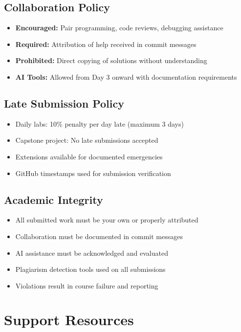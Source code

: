\documentclass[11pt,a4paper]{article}
\begin{document}
\subsection{Collaboration Policy}
\begin{itemize}
    \item \textbf{Encouraged:} Pair programming, code reviews, debugging assistance
    \item \textbf{Required:} Attribution of help received in commit messages
    \item \textbf{Prohibited:} Direct copying of solutions without understanding
    \item \textbf{AI Tools:} Allowed from Day 3 onward with documentation requirements
\end{itemize}

\subsection{Late Submission Policy}
\begin{itemize}
    \item Daily labs: 10\% penalty per day late (maximum 3 days)
    \item Capstone project: No late submissions accepted
    \item Extensions available for documented emergencies
    \item GitHub timestamps used for submission verification
\end{itemize}

\subsection{Academic Integrity}
\begin{itemize}
    \item All submitted work must be your own or properly attributed
    \item Collaboration must be documented in commit messages
    \item AI assistance must be acknowledged and evaluated
    \item Plagiarism detection tools used on all submissions
    \item Violations result in course failure and reporting
\end{itemize}

\section{Support Resources}
\end{document}
